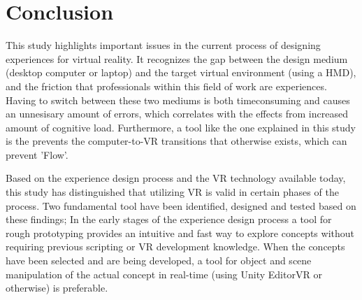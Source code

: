 \chapter{Conclusion}
This study highlights important issues in the current process of designing experiences for virtual reality. It recognizes the gap between the design medium (desktop computer or laptop) and the target virtual environment (using a HMD), and the friction that professionals within this field of work are experiences. Having to switch between these two mediums is both timeconsuming and causes an unnesisary amount of errors, which correlates with the effects from increased amount of cognitive load. Furthermore, a tool like the one explained in this study is the prevents the computer-to-VR transitions that otherwise exists, which can prevent 'Flow'.

Based on the experience design process and the VR technology available today, this study has distinguished that utilizing VR  is valid in certain phases of the process. Two fundamental tool have been identified, designed and tested based on these findings; In the early stages of the experience design process a tool for rough prototyping provides an intuitive and fast way to explore concepts without requiring previous scripting or VR development knowledge. When the concepts have been selected and are being developed, a tool for object and scene manipulation of the actual concept in real-time (using Unity EditorVR or otherwise) is preferable.

